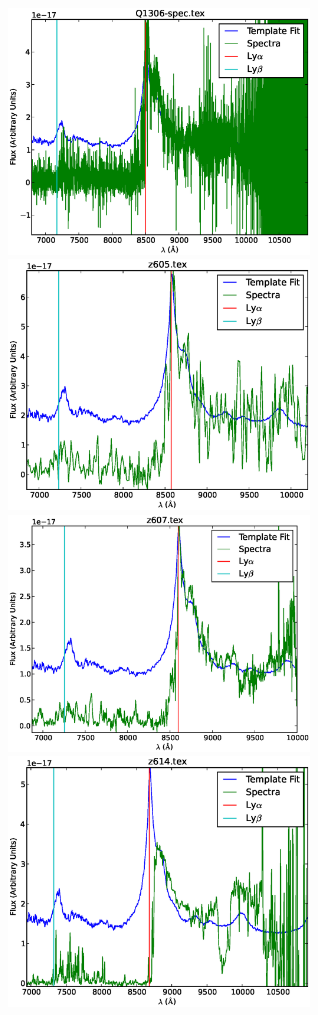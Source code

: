 \documentclass[11pt]{article}
\begin{document}
\begin{figure}[h]
  \centering
  \includegraphics[width=8cm]{Q1306-spec.eps}
  \includegraphics[width=8cm]{z605.eps}
  \includegraphics[width=8cm]{z607.eps}
  \includegraphics[width=8cm]{z614.eps}

\end{figure}
\end{document}
